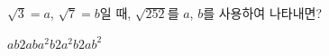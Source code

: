 $\sqrt{3}=a$, $\sqrt{7}=b$일 때, $\sqrt{252}$를 $a$, $b$를 사용하여 나타내면?
\begin{choices32}{$ab$}{$2ab$}{$a^2b$}{$2a^2b$}{$2ab^2$}\end{choices32}
